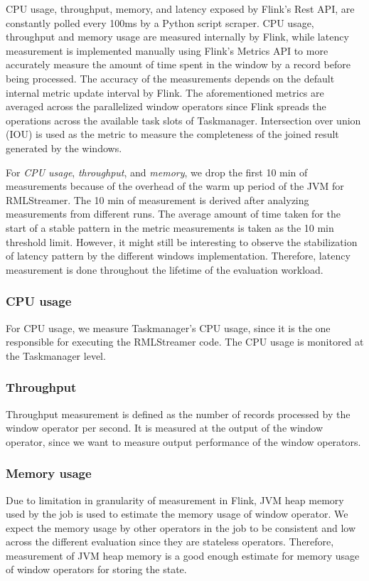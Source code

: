 CPU usage, throughput, memory, and latency exposed 
by Flink's Rest API, are constantly polled every 100ms by a 
Python script scraper.
CPU usage, throughput 
and memory usage are measured internally by Flink,
while latency measurement 
is implemented manually using Flink's Metrics API to more accurately measure the amount of 
time spent in the window by a record before being processed. The accuracy of the 
measurements depends on the default internal metric update interval by Flink.
The aforementioned metrics are averaged across the parallelized window operators since 
Flink spreads the operations across the available task slots of Taskmanager. 
Intersection over union (IOU) is used as the metric to measure the completeness
of the joined result generated by the windows.  

For \emph{CPU usage}, \emph{throughput}, and \emph{memory}, we drop the first 10 min of 
measurements because of the overhead of the warm up period of the JVM for RMLStreamer. 
The 10 min of measurement is derived after analyzing measurements from 
different runs. The average amount of time taken 
for the start of a stable pattern in the metric measurements is taken as 
the 10 min threshold limit. 
However, it might still be interesting to observe the stabilization of latency pattern by the 
different windows implementation. Therefore, latency measurement is done throughout the 
lifetime of the evaluation workload. 

\subsubsection{CPU usage}%
\label{ssub:CPU usage}
For CPU usage, we measure Taskmanager's CPU usage, since it is 
the one responsible for executing the RMLStreamer code. The CPU usage is 
monitored at the Taskmanager level. 

\subsubsection{Throughput}%
\label{ssub:Throughput}
Throughput measurement is defined as the number of records processed by the 
window operator per second. 
It is measured at the output of the window operator, since we want to measure 
output performance of the window operators. 


\subsubsection{Memory usage}%
\label{ssub:Memory usage}
Due to limitation in granularity of measurement in Flink, 
JVM heap memory used by the job is used to estimate the memory usage of window 
operator. We expect the memory usage by other operators in the job to be 
consistent and low across the different evaluation since they are stateless operators.
Therefore, measurement of JVM heap memory is a good enough estimate for memory usage 
of window operators for storing the state. 


